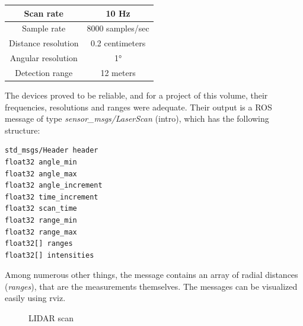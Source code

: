 \begin{center}
    \begin{tabular}{ | c | c | }
        \hline
        Scan rate           & 10 Hz            \\
        \hline
        Sample rate         & 8000 samples/sec \\
        \hline 
        Distance resolution & 0.2 centimeters  \\
        \hline 
        Angular resolution  & 1°               \\
        \hline 
        Detection range     & 12 meters        \\
        \hline
    \end{tabular}
\end{center}

The devices proved to be reliable, and for a project of this volume, their frequencies, resolutions and ranges were adequate. Their output is a ROS message of type \textit{sensor\_msgs/LaserScan} \cite{ros_msg_LaserScan} (intro), which has the following structure:

\begin{minipage}{\textwidth}
\begin{lstlisting}[language=IDL]
std_msgs/Header header
float32 angle_min
float32 angle_max
float32 angle_increment
float32 time_increment
float32 scan_time
float32 range_min
float32 range_max
float32[] ranges
float32[] intensities
\end{lstlisting}
\end{minipage}

Among numerous other things, the message contains an array of radial distances (\textit{ranges}), that are the measurements themselves. The messages can be visualized easily using rviz.

\begin{figure}[!ht]
    \centering
    \caption{LIDAR scan}
    \label{lidar_scan}
\end{figure}


